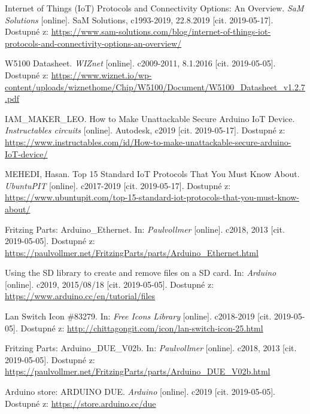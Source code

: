 \renewcommand{\refname}{Reference}
\begin{thebibliography}{30}
\hypersetup{urlcolor=black}

  Internet of Things (IoT) Protocols and Connectivity Options: An Overview. \textit{SaM Solutions} [online]. SaM Solutions, c1993-2019, 22.8.2019 [cit. 2019-05-17]. Dostupné z: \url{https://www.sam-solutions.com/blog/internet-of-things-iot-protocols-and-connectivity-options-an-overview/}

  W5100 Datasheet. \textit{WIZnet} [online]. c2009-2011, 8.1.2016 [cit. 2019-05-05]. Dostupné z: \url{https://www.wiznet.io/wp-content/uploads/wiznethome/Chip/W5100/Document/W5100\_Datasheet\_v1.2.7.pdf}

  IAM\_MAKER\_LEO. How to Make Unattackable Secure Arduino IoT Device. \textit{Instructables circuits} [online]. Autodesk, c2019 [cit. 2019-05-17]. Dostupné z: \url{https://www.instructables.com/id/How-to-make-unattackable-secure-arduino-IoT-device/}

MEHEDI, Hasan. Top 15 Standard IoT Protocols That You Must Know About. \textit{UbuntuPIT} [online]. c2017-2019 [cit. 2019-05-17]. Dostupné z:\\ \url{https://www.ubuntupit.com/top-15-standard-iot-protocols-that-you-must-know-about/}



Fritzing Parts: Arduino\_Ethernet. In: \textit{Paulvollmer} [online]. c2018, 2013 [cit. 2019-05-05]. Dostupné z: \url{https://paulvollmer.net/FritzingParts/parts/Arduino\_Ethernet.html}

Using the SD library to create and remove files on a SD card. In: \textit{Arduino} [online]. c2019, 2015/08/18 [cit. 2019-05-05]. Dostupné z: \url{https://www.arduino.cc/en/tutorial/files}

Lan Switch Icon \#83279. In: \textit{Free Icons Library} [online]. c2018-2019 [cit. 2019-05-05]. Dostupné z: \url{http://chittagongit.com/icon/lan-switch-icon-25.html}

Fritzing Parts: Arduino\_DUE\_V02b. In: \textit{Paulvollmer} [online]. c2018, 2013 [cit. 2019-05-05]. Dostupné z: \url{https://paulvollmer.net/FritzingParts/parts/Arduino\_DUE\_V02b.html}

Arduino store: ARDUINO DUE. \textit{Arduino} [online]. c2019 [cit. 2019-05-05]. Dostupné z: \url{https://store.arduino.cc/due}



\end{thebibliography}
